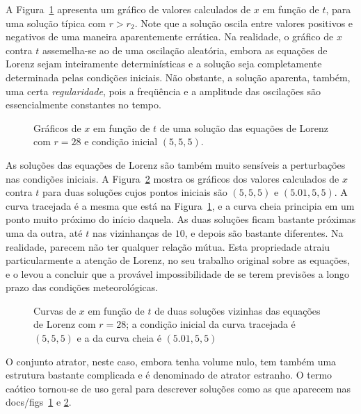 A Figura~\ref{figlorenzx} apresenta um gráfico de valores calculados de $x$ em função de $t$, para uma solução típica com $r>r_{2}$. Note que a solução oscila entre valores positivos e negativos de uma maneira aparentemente errática. Na realidade, o gráfico de $x$ contra $t$ assemelha-se ao de uma oscilação aleatória, embora as equações de Lorenz sejam inteiramente determinísticas e a solução seja completamente determinada pelas condições iniciais. Não obstante, a solução aparenta, também, uma certa \textit{regularidade}, pois a freqüência e a amplitude das oscilações são essencialmente constantes no tempo.

\begin{figure}[ht]
\centering {} 
\caption{Gráficos de $x$ em função de $t$ de uma solução das equações de Lorenz com $r=28$ e condição inicial $(5,5,5)$.}
\label{figlorenzx}
\end{figure}

As soluções das equações de Lorenz são também muito sensíveis a perturbações nas condições iniciais. A Figura~\ref{figlorenzxci} mostra os gráficos dos valores calculados de $x$ contra $t$ para duas soluções cujos pontos iniciais são $(5,5,5)$ e $(5.01,5,5)$. A curva tracejada é a mesma que está na Figura~\ref{figlorenzx}, e a curva cheia principia em um ponto muito próximo do início daquela. As duas soluções ficam bastante próximas uma da outra, até $t$ nas vizinhanças de $10$, e depois são bastante diferentes. Na realidade, parecem não ter qualquer relação mútua. Esta propriedade atraiu particularmente a atenção de Lorenz, no seu trabalho original sobre as equações, e o levou a concluir que a provável impossibilidade de se terem previsões a longo prazo das condições meteorológicas.

\begin{figure}[ht]
\centering {} 
\caption{Curvas de $x$ em função de $t$ de duas soluções vizinhas das equações de Lorenz com $r=28$; a condição inicial da curva tracejada é $(5,5,5)$ e a da curva cheia é $(5.01,5,5)$}
\label{figlorenzxci}
\end{figure}

O conjunto atrator, neste caso, embora tenha volume nulo, tem também uma estrutura bastante complicada e é denominado de atrator estranho. O termo caótico tornou-se de uso geral para descrever soluções como as que aparecem nas docs/figs~\ref{figlorenzx} e \ref{figlorenzxci}.

